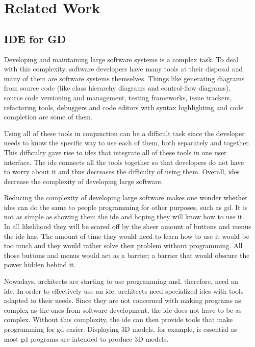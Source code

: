 \documentclass{./llncs2e/llncs}
\begin{document}
\section{Related Work}

\subsection{IDE for GD}
	Developing and maintaining large software systems is a complex task.
	To deal with this complexity, software developers have many tools at their disposal and many of them are software systems themselves.
	Things like generating diagrams from source code (like class hierarchy diagrams and control-flow diagrams), source code versioning and management, testing frameworks, issue trackers, refactoring tools, debuggers and code editors with syntax highlighting and code completion are some of them.

	Using all of these tools in conjunction can be a difficult task since the developer needs to know the specific way to use each of them, both separately and together.
	This difficulty gave rise to \ac{ide}s that integrate all of these tools in one user interface.
	The \ac{ide} connects all the tools together so that developers do not have to worry about it and thus decreases the difficulty of using them.
	Overall, \ac{ide}s decrease the complexity of developing large software.

	Reducing the complexity of developing large software makes one wonder whether \acp{ide} can do the same to people programming for other purposes, such as \ac{gd}.
	It is not as simple as showing them the \ac{ide} and hoping they will know how to use it.
	In all likelihood they will be scared off by the sheer amount of buttons and menus the \ac{ide} has.
	The amount of time they would need to learn how to use it would be too much and they would rather solve their problem without programming.
	All those buttons and menus would act as a barrier; a barrier that would obscure the power hidden behind it.
	
	Nowadays, architects are starting to use programming and, therefore, need an \ac{ide}. 
	In order to effectively use an \ac{ide}, architects need specialized \acp{ide} with tools adapted to their needs.
	Since they are not concerned with making programs as complex as the ones from software development, the \ac{ide} does not have to be as complex.
	Without this complexity, the \ac{ide} can then provide tools that make programming for \ac{gd} easier.
	Displaying 3D models, for example, is essential as most \ac{gd} programs are intended to produce 3D models.
	
\end{document}
